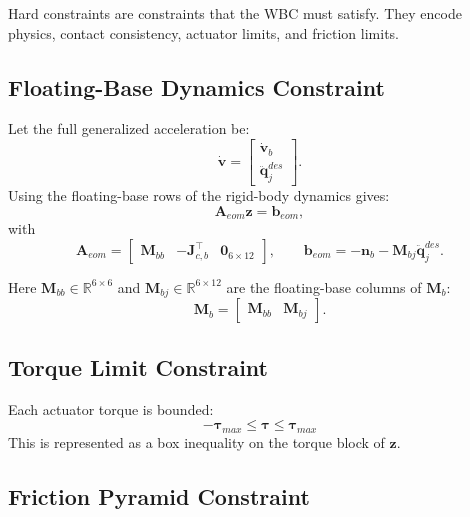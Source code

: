 \documentclass[11pt,a4paper]{article}
\newcommand{\R}{\mathbb{R}}
\begin{document}
Hard constraints are constraints that the WBC must satisfy. They encode physics, contact consistency, actuator limits, and friction limits.

\subsection{Floating-Base Dynamics Constraint}

Let the full generalized acceleration be:
\begin{equation}
	\dot{\bm{v}}
	=
	\begin{bmatrix}
		\dot{\bm{v}}_b\\
		\ddot{\bm{q}}_j^{des}
	\end{bmatrix}.
\end{equation}
Using the floating-base rows of the rigid-body dynamics gives:
\begin{equation}
	\bm{A}_{eom}\bm{z} = \bm{b}_{eom},
\end{equation}
with
\begin{equation}
	\bm{A}_{eom}
	=
	\begin{bmatrix}
		\bm{M}_{bb} & -\bm{J}_{c,b}^{\top} & \bm{0}_{6\times12}
	\end{bmatrix},
	\qquad
	\bm{b}_{eom}
	=
	-\bm{n}_b - \bm{M}_{bj}\ddot{\bm{q}}_j^{des}.
\end{equation}

Here $\bm{M}_{bb}\in\R^{6\times6}$ and $\bm{M}_{bj}\in\R^{6\times12}$ are the floating-base columns of $\bm{M}_b$:
\begin{equation}
	\bm{M}_b
	=
	\begin{bmatrix}
		\bm{M}_{bb} & \bm{M}_{bj}
	\end{bmatrix}.
\end{equation}

\subsection{Torque Limit Constraint}

Each actuator torque is bounded:
\begin{equation}
	\boxed{
		-\bm{\tau}_{max}
		\leq
		\bm{\tau}
		\leq
		\bm{\tau}_{max}
	}
\end{equation}
This is represented as a box inequality on the torque block of $\bm{z}$.

\subsection{Friction Pyramid Constraint}
\end{document}
